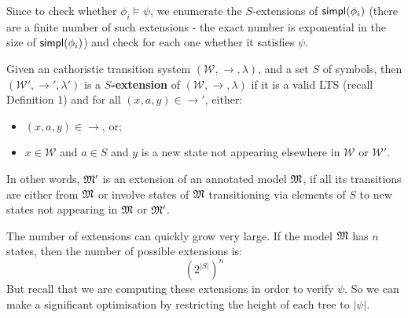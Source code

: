 
Since to check whether $\phi_i \models \psi$, we enumerate the
$S$-extensions of $\mathsf{simpl}(\phi_i)$ (there are a finite number of such
extensions - the exact number is exponential in the size of
$\mathsf{simpl}(\phi_i)$) and check for each one whether it satisfies $\psi$.

\begin{definition}
Given an cathoristic transition system $(\mathcal{W},\rightarrow,\lambda)$,  and a set $S$ of symbols, then $(\mathcal{W'},\rightarrow',\lambda')$ is a {\bf $S$-extension} of $(\mathcal{W},\rightarrow,\lambda)$ if it is a valid LTS (recall Definition 1) and for all $(x,a,y) \in \rightarrow'$, either:
\begin{itemize} 
\item
$(x, a, y) \in \rightarrow$,  or;
\item
 $x \in \mathcal{W}$ and $a \in S$ and $y$ is a new state not appearing elsewhere in $\mathcal{W}$ or $\mathcal{W'}$.
\end{itemize}
\end{definition}
In other words, $\frak{M}'$ is an extension of an annotated model $\frak{M}$, if all its transitions are either from $\frak{M}$ or involve states of $\frak{M}$ transitioning via elements of $S$ to new states not appearing in $\frak{M}$ or $\frak{M}'$.

The number of extensions can quickly grow very large.
If the model $\frak{M}$ has $n$ states, then the number of possible extensions is:
\[
({2^{|S|}})^n
\] 
But recall that we are computing these extensions in order to verify $\psi$. So we can make a significant optimisation by restricting the height of each tree to $|\psi|$.

